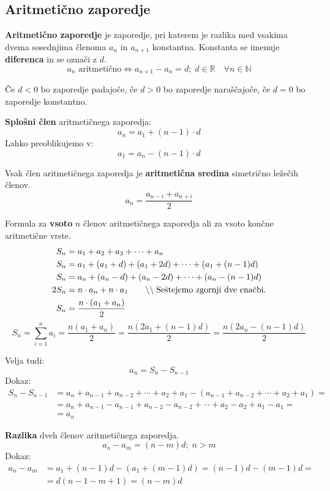 \documentclass[a4paper,oneside,12pt,fleqn]{article}
\def\R{\ensuremath{\mathbb R}}
\def\N{\ensuremath{\mathbb N}}
\newcommand\krat\cdot
\newcommand{\comment}[1]{\ensuremath{\qquad\backslash\backslash\;}\textnormal{#1}}
\renewcommand\iff\Leftrightarrow
\numberwithin{equation}{section}
\begin{document}
\subsection{Aritmetično zaporedje}
\label{sec:zap:aritm}
\textbf{Aritmetično zaporedje} je zaporedje, pri katerem je razlika med vsakima dvema
sosednjima členoma $a_n$ in $a_{n+1}$ konstantna. Konstanta se imenuje \textbf{diferenca} in se označi z $d$.
\[ a_n \text{ aritmetično} \iff a_{n+1} - a_n = d; \; d \in \R \quad \forall n \in \N \]

Če $d < 0$ bo zaporedje padajoče, če $d > 0$ bo zaporedje naraščajoče, če $d = 0$ bo
zaporedje konstantno.

\textbf{Splošni člen} aritmetičnega zaporedja:
\[ a_n = a_1 + (n-1)\krat d \]
Lahko preoblikujemo v:
\[ a_1 = a_n - (n-1)\krat d \]

Vsak člen aritmetičnega zaporedja je \textbf{aritmetična sredina} simetrično ležečih členov.
\[ a_n = \frac{a_{n-i} + a_{n+i}}{2} \]

Formula za \textbf{vsoto} $n$ členov aritmetičnega zaporedja ali za vsoto končne
aritmetične vrste.
\begin{align*}
  S_n &= a_1 + a_2 + a_3 + \cdots + a_n \\
  S_n &= a_1 + (a_1 + d) + (a_1 + 2d) + \cdots + (a_1 + (n-1)d) \\
  S_n &= a_n + (a_n - d) + (a_n - 2d) + \cdots + (a_n - (n-1)d) \\
  2S_n &= n\krat a_n + n \krat a_1 \comment{Seštejemo zgornji dve enačbi.} \\
  S_n &= \frac{n\krat(a_1 + a_n)}{2}
\end{align*}
\begin{equation}
  S_n = \sum_{i = 1}^n a_i = \frac{n(a_1 + a_n)}{2} = \frac{n(2a_1 + (n-1)d)}{2} =
  \frac{n(2a_n - (n-1)d)}{2} \label{eq:zap:arisum}
\end{equation}

Velja tudi:
\[ a_n = S_n - S_{n-1} \]
Dokaz:
\begin{align*}
  S_n - S_{n-1} &= a_n + a_{n-1} + a_{n-2} + \cdots + a_2 + a_1 - (a_{n-1} + a_{n-2} +
  \cdots + a_2 + a_1) = \\ &= a_n + a_{n-1} - a_{n-1} + a_{n-2} - a_{n-2} + \cdots + a_2 - a_2 +
  a_1 - a_1 = \\ &=  a_n
\end{align*}

\textbf{Razlika} dveh členov aritmetičnega zaporedja.
\[ a_n - a_m = (n-m)d; \; n > m \]
Dokaz:
\begin{align*}
  a_n - a_m &=  a_1 + (n-1)d - ( a_1 + (m-1)d) = (n-1)d - (m-1)d = \\
  &= d(n-1-m+1) = (n-m)d
\end{align*}
\end{document}
